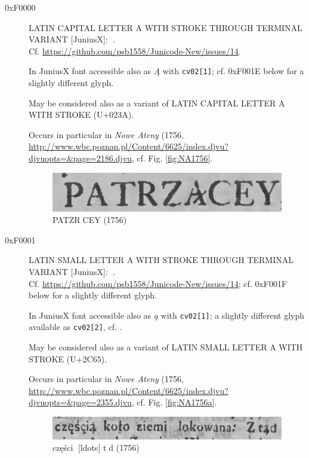 \documentclass{article}
\newcommand{\Jglyph}[1]{{\relsize{2}\J#1}}
\begin{document}
\begin{description}
\item[0xF0000] LATIN CAPITAL LETTER A WITH STROKE THROUGH TERMINAL
  VARIANT [JuniusX]: \Jglyph{󰀀}.\\
  Cf. \url{https://github.com/psb1558/Junicode-New/issues/14}.
  
  In JuniusX font accessible also as \textit{Ą} with \texttt{cv02[1]};
  cf.  0xF001E  below for a slightly different glyph.

  May be considered also as a variant of LATIN CAPITAL LETTER A WITH
  STROKE (U+023A).

  Occurs in particular in \textit{Nowe Ateny} (1756,
  \url{http://www.wbc.poznan.pl/Content/6625/index.djvu?djvuopts=&page=2186.djvu},
  cf. Fig. \vref{fig:NA1756}.

  \begin{figure}[h]
    \includegraphics{img/00433085patrzacey}
    \caption{{\J PATZR󰀂CEY} (1756)}
    \label{fig:NA1756}
  \end{figure}

\item [0xF0001] LATIN SMALL LETTER A WITH STROKE THROUGH TERMINAL VARIANT [JuniusX]: 
  \Jglyph{󰀁}.\\ Cf. \url{https://github.com/psb1558/Junicode-New/issues/14};
  cf. 0xF001F below for a slightly different glyph.

  In JuniusX font accessible also as \textit{ą} with \texttt{cv02[1]};
  a slightly different glyph available as \texttt{cv02[2]},
  cf. \autocite[p. 7]{baker20:_opent_featur_junius_junius}.


  May be considered also as a variant of LATIN SMALL LETTER A WITH
  STROKE (U+2C65).

  Occurs in particular in \textit{Nowe Ateny} (1756, \url{
    http://www.wbc.poznan.pl/Content/6625/index.djvu?djvuopts=&page=2355.djvu},
  cf. Fig. \vref{fig:NA1756a}.
 

  \begin{figure}[h]
    \includegraphics[width=1.3\textwidth]{img/00433254czescZtad.png}
    \caption{{\J części󰀁 [ldots] t󰀁d} (1756)}
    \label{fig:NA1756a}
  \end{figure}



\end{description}
\end{document}
